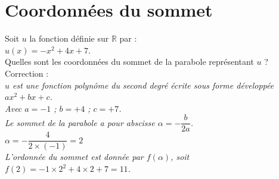 \documentclass[11pt]{article}
\begin{document}
\newpage

\section{Coordonnées du sommet}

\begin{exercice}
 Soit $u$ la fonction définie sur $\mathbb{R}$ par :\\
 $u(x)=-x^2+4x+7$. \\
Quelles sont les coordonnées du sommet de la parabole représentant $u$ ? \\
Correction :\\
\textit{ $u$ est une fonction polynôme du second degré écrite sous
forme développée $ax^2+bx+c$.\\
Avec $a=-1$ ; $b=+4$ ; $c=+7$. \\
          Le sommet de la parabole a pour abscisse $\alpha =-\dfrac{b}{2a}$.\\
          $\alpha =-\dfrac{4}{2\times(-1) }= 2$ \\
          L'ordonnée du sommet est donnée par $f(\alpha)$, soit \\
          $f(2)=-1\times 2^2+4\times 2+7=11$.}
\end{exercice}


\begin{exercice}

\end{exercice}
\end{document}
